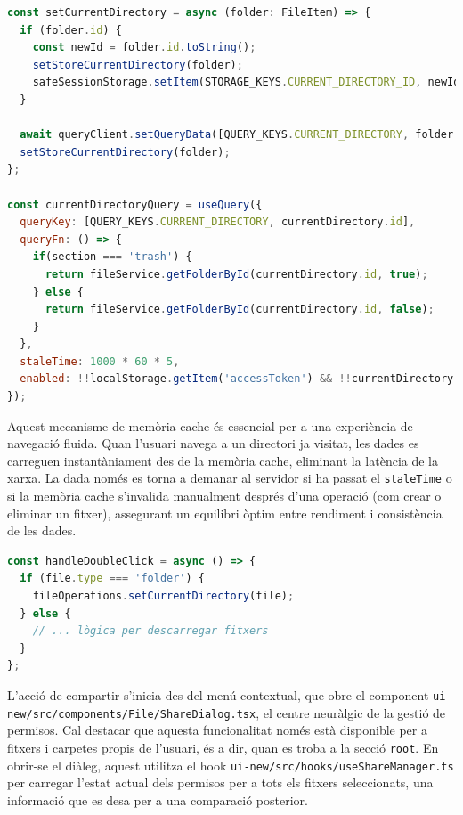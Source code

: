 \begin{lstlisting}[language=javascript, caption={Gestió del directori actual amb `useQuery` a `useFileOperations.ts`}]
const setCurrentDirectory = async (folder: FileItem) => {
  if (folder.id) {
    const newId = folder.id.toString();
    setStoreCurrentDirectory(folder);
    safeSessionStorage.setItem(STORAGE_KEYS.CURRENT_DIRECTORY_ID, newId);
  }
  
  await queryClient.setQueryData([QUERY_KEYS.CURRENT_DIRECTORY, folder.id], folder);
  setStoreCurrentDirectory(folder);
};

const currentDirectoryQuery = useQuery({
  queryKey: [QUERY_KEYS.CURRENT_DIRECTORY, currentDirectory.id],
  queryFn: () => {
    if(section === 'trash') {
      return fileService.getFolderById(currentDirectory.id, true);
    } else {
      return fileService.getFolderById(currentDirectory.id, false);
    }
  }, 
  staleTime: 1000 * 60 * 5,
  enabled: !!localStorage.getItem('accessToken') && !!currentDirectory.id,
});
\end{lstlisting}

Aquest mecanisme de memòria cache és essencial per a una experiència de navegació fluida. Quan l'usuari navega a un directori ja visitat, les dades es carreguen instantàniament des de la memòria cache, eliminant la latència de la xarxa. La dada només es torna a demanar al servidor si ha passat el \texttt{staleTime} o si la memòria cache s'invalida manualment després d'una operació (com crear o eliminar un fitxer), assegurant un equilibri òptim entre rendiment i consistència de les dades.

\begin{lstlisting}[language=javascript, caption={Navegació per doble clic a `File/index.tsx`}]
const handleDoubleClick = async () => {
  if (file.type === 'folder') {
    fileOperations.setCurrentDirectory(file);
  } else {
    // ... lògica per descarregar fitxers
  }
};
\end{lstlisting}

L'acció de compartir s'inicia des del menú contextual, que obre el component \texttt{ui-new/src/components/File/ShareDialog.tsx}, el centre neuràlgic de la gestió de permisos. Cal destacar que aquesta funcionalitat només està disponible per a fitxers i carpetes propis de l'usuari, és a dir, quan es troba a la secció \texttt{root}. En obrir-se el diàleg, aquest utilitza el hook \texttt{ui-new/src/hooks/useShareManager.ts} per carregar l'estat actual dels permisos per a tots els fitxers seleccionats, una informació que es desa per a una comparació posterior.

